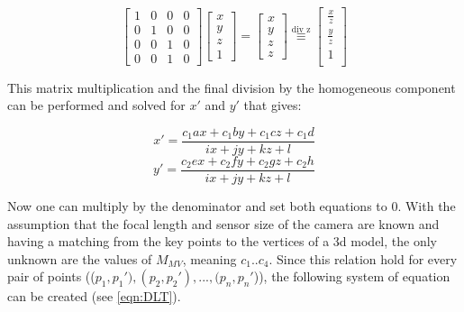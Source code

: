 \documentclass[conference]{IEEEtran}
\begin{document}
\begin{equation}
    \begin{bmatrix}
        1 & 0 & 0 & 0 \\
        0 & 1 & 0 & 0 \\
        0 & 0 & 1 & 0 \\
        0 & 0 & 1 & 0
    \end{bmatrix}
    \begin{bmatrix}
        x \\
        y \\
        z \\
        1
    \end{bmatrix}
    =
    \begin{bmatrix}
        x \\
        y \\
        z \\
        z
    \end{bmatrix}
    \overset{\text{div z}}{\equiv}
    \begin{bmatrix}
        \frac{x}{z} \\
        \frac{y}{z} \\
        1           \\
    \end{bmatrix}
\end{equation}

This matrix multiplication and the final division by the homogeneous component can be performed and solved for $x'$ and $y'$ that gives:

\begin{equation}
    x' = \frac{c_1 a x + c_1 b y + c_1 c z + c_1 d}{ix + jy + kz + l}
\end{equation}
\begin{equation}
    y' = \frac{c_2 e x + c_2 f y + c_2 g z + c_2 h}{ix + jy + kz + l}
\end{equation}

Now one can multiply by the denominator and set both equations to 0. With the assumption that the focal length and sensor size of the camera are known and having a matching from the key points to the vertices of a 3d model, the only unknown are the values of $M_{MV}$, meaning $c_{1}..c_{4}$. Since this relation hold for every pair of points (($p_{1} , p_{1}'), (p_{2} , p_{2}'), ..., (p_{n}, p_{n}'$)), the following system of equation can be created (see \ref{eqn:DLT}).
\end{document}
